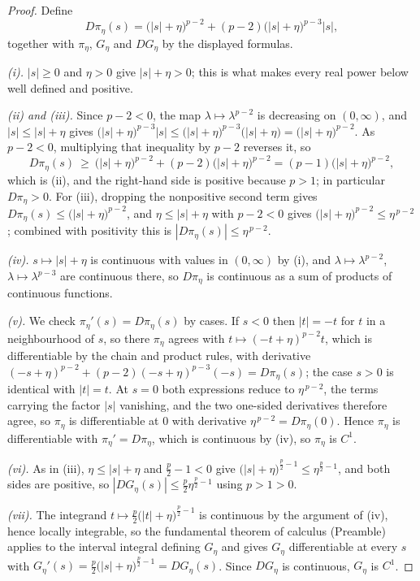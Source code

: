 \begin{proof}
Define
\[
D\pi_\eta(s)=\bigl(|s|+\eta\bigr)^{p-2}+(p-2)\bigl(|s|+\eta\bigr)^{p-3}|s|,
\]
together with $\pi_\eta$, $G_\eta$ and $DG_\eta$ by the displayed formulas.

\emph{(i).}  $|s|\ge0$ and $\eta>0$ give $|s|+\eta>0$; this is what makes every
real power below well defined and positive.

\emph{(ii) and (iii).}  Since $p-2<0$, the map $\lambda\mapsto\lambda^{p-2}$ is
decreasing on $(0,\infty)$, and $|s|\le|s|+\eta$ gives
$\bigl(|s|+\eta\bigr)^{p-3}|s|\le\bigl(|s|+\eta\bigr)^{p-3}\bigl(|s|+\eta\bigr)
=\bigl(|s|+\eta\bigr)^{p-2}$.  As $p-2<0$, multiplying that inequality by
$p-2$ reverses it, so
\[
D\pi_\eta(s)\ \ge\ \bigl(|s|+\eta\bigr)^{p-2}+(p-2)\bigl(|s|+\eta\bigr)^{p-2}
=(p-1)\bigl(|s|+\eta\bigr)^{p-2},
\]
which is (ii), and the right-hand side is positive because $p>1$; in
particular $D\pi_\eta>0$.  For (iii), dropping the nonpositive second term
gives $D\pi_\eta(s)\le\bigl(|s|+\eta\bigr)^{p-2}$, and
$\eta\le|s|+\eta$ with $p-2<0$ gives
$\bigl(|s|+\eta\bigr)^{p-2}\le\eta^{\,p-2}$; combined with positivity this is
$|D\pi_\eta(s)|\le\eta^{\,p-2}$.

\emph{(iv).}  $s\mapsto|s|+\eta$ is continuous with values in $(0,\infty)$ by
(i), and $\lambda\mapsto\lambda^{p-2}$, $\lambda\mapsto\lambda^{p-3}$ are
continuous there, so $D\pi_\eta$ is continuous as a sum of products of
continuous functions.

\emph{(v).}  We check $\pi_\eta'(s)=D\pi_\eta(s)$ by cases.  If $s<0$ then
$|t|=-t$ for $t$ in a neighbourhood of $s$, so there $\pi_\eta$ agrees with
$t\mapsto(-t+\eta)^{p-2}t$, which is differentiable by the chain and product
rules, with derivative
$(-s+\eta)^{p-2}+(p-2)(-s+\eta)^{p-3}(-s)=D\pi_\eta(s)$; the case $s>0$ is
identical with $|t|=t$.  At $s=0$ both expressions reduce to $\eta^{\,p-2}$,
the terms carrying the factor $|s|$ vanishing, and the two one-sided
derivatives therefore agree, so $\pi_\eta$ is differentiable at $0$ with
derivative $\eta^{\,p-2}=D\pi_\eta(0)$.  Hence $\pi_\eta$ is differentiable
with $\pi_\eta'=D\pi_\eta$, which is continuous by (iv), so $\pi_\eta$ is
$C^1$.

\emph{(vi).}  As in (iii), $\eta\le|s|+\eta$ and $\tfrac p2-1<0$ give
$\bigl(|s|+\eta\bigr)^{\frac p2-1}\le\eta^{\frac p2-1}$, and both sides are
positive, so $|DG_\eta(s)|\le\tfrac p2\eta^{\frac p2-1}$ using $p>1>0$.

\emph{(vii).}  The integrand $t\mapsto\tfrac p2\bigl(|t|+\eta\bigr)^{\frac p2-1}$
is continuous by the argument of (iv), hence locally integrable, so the
fundamental theorem of calculus (Preamble) applies to the interval integral
defining $G_\eta$ and gives $G_\eta$ differentiable at every $s$ with
$G_\eta'(s)=\tfrac p2\bigl(|s|+\eta\bigr)^{\frac p2-1}=DG_\eta(s)$.  Since
$DG_\eta$ is continuous, $G_\eta$ is $C^1$.
\end{proof}
